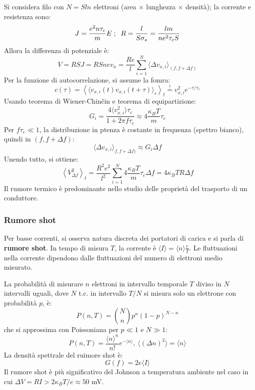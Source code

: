 \documentclass[10pt, a4paper]{scrartcl}
\numberwithin{equation}{subsection}
\theoremstyle{style1}
\begin{document}
Si considera filo con $N = S l n$ elettroni (area $\times $ lunghezza $\times $ densit\`a); la corrente e resistenza sono:
\[
	J = \frac{e^2 n \tau _c }{m}E \hspace{.1cm} ; \hspace{.2cm} R = \frac{l}{S\sigma _s} = \frac{lm}{ne^2 \tau _c S}
\] 
Allora la differenza di potenziale \`e:
\[
V = RSJ = RSnev_x = \frac{Re}{l} \sum_{i=1}^{N} \langle \Delta v_{x,i}  \rangle_{(f,f+\Delta f)} 
\] 
Per la funzione di autocorrelazione, si assume la fomra:
\[
c(\tau ) = \left\langle \langle v_{x,i} (t) v_{x,i} (t+\tau ) \rangle_s \right\rangle_t \stackrel{!}{=} v_{x,i} ^2 e^{ - \tau  / \tau _c} 
\] 
Usando teorema di Wiener-Chin\v cin e teorema di equipartizione:
\begin{equation}
	G_i = \frac{4 \langle v_{x,i} ^2 \rangle\tau _c}{1+ 2 \pi f \tau _c} \approx 4 \frac{\kappa _B T}{m}\tau _c
\end{equation}
Per $f\tau _c \ll 1$, la distribuzione in ptenza \`e costante in frequenza (spettro bianco), quindi in $(f,f+\Delta f)$:
\[
\langle \Delta v_{x,i}  \rangle_{f,f+\Delta f)} \approx G_i \Delta f
\] 
Unendo tutto, si ottiene:
\begin{equation}
	\left\langle V^2_{\Delta f}  \right\rangle_t = \frac{R^2 e^2}{l^2} \sum_{i=1}^{N} 4 \frac{\kappa _B T}{m}\tau_c \Delta f = 4 \kappa _B T R \Delta f
\end{equation}
Il rumore termico \`e predominante nello studio delle propriet\`a del trasporto di un conduttore.

\subsubsection{Rumore shot}

Per basse correnti, si osserva natura discreta dei portatori di carica e si parla di \textbf{rumore shot}. 
In tempo di misura $T$, la corrente \`e $\langle I \rangle = \langle n \rangle \frac{e}{T}$.
Le fluttuazioni nella corrente dipendono dalle fluttuazioni del numero di elettroni medio misurato.

La probabilit\`a di misurare $n$ elettroni in intervallo temporale $T$ diviso in $N$ intervalli uguali, dove $N$ t.c. in intervallo $T / N$ si misura solo un elettrone con probabilit\`a $p$, \`e:
\begin{equation}
	P(n,T) = \binom{N}{n} p^n (1-p)^{N-n} 
\end{equation}
che si approssima con Poissoniana per $p\ll 1 $ e $N \gg 1$:
\begin{equation}
	P(n,T) = \frac{\langle n \rangle^n}{n!}e^{- \langle n \rangle} ,\ \langle (\Delta n)^2 \rangle = \langle n \rangle
\end{equation}
La densit\`a spettrale del ruimore shot \`e:
\begin{equation}
	G(f) = 2e \langle I \rangle
\end{equation}
Il rumore shot \`e pi\`u significativo del Johnson a temperatura ambiente nel caso in cui $\Delta V = RI > 2\kappa _BT / e \approx 50$ mV.
\end{document}

